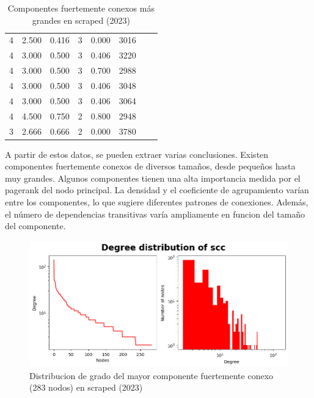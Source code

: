 \begin{table}
\begin{tabular}{|c|c|c|c|c|c|c|c|}
        4             & 2.500           & 0.416            & 3                 & 0.000                & 3016                  \\
        4             & 3.000           & 0.500            & 3                 & 0.406                & 3220                  \\
        4             & 3.000           & 0.500            & 3                 & 0.700                & 2988                  \\
        4             & 3.000           & 0.500            & 3                 & 0.406                & 3048                  \\
        4             & 3.000           & 0.500            & 3                 & 0.406                & 3064                  \\
        4             & 4.500           & 0.750            & 2                 & 0.800                & 2948                  \\
        3             & 2.666           & 0.666            & 2                 & 0.000                & 3780                  \\
        \hline
    \end{tabular}
    \caption{Componentes fuertemente conexos más grandes en scraped (2023)}
    \label{table:scc}
\end{table}

A partir de estos datos, se pueden extraer varias conclusiones. Existen componentes fuertemente conexos de diversos
tamaños, desde pequeños hasta muy grandes. Algunos componentes tienen una alta importancia medida por el pagerank
del nodo principal. La densidad y el coeficiente de agrupamiento varían entre los componentes, lo que sugiere diferentes
patrones de conexiones. Además, el número de dependencias transitivas varía ampliamente en funcion del tamaño del componente.

\begin{figure}[h!]
    \begin{center}
        \includegraphics[width=1\textwidth]{img/pypi/scc1_dist.png}
        \caption{Distribucion de grado del mayor componente fuertemente conexo (283 nodos) en scraped (2023)}
    \end{center}
\end{figure}

